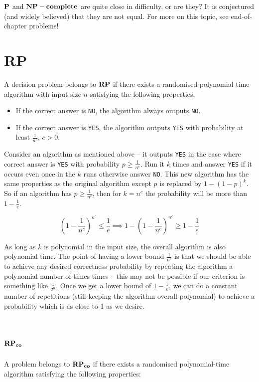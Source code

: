 $\mathbf{P}$ and $\mathbf{NP-complete}$ are quite close in difficulty, or are they? It is conjectured (and widely believed) that they 
are not equal. For more on this topic, see end-of-chapter problems!
\section{RP}

A decision problem belongs to $\mathbf{RP}$ if there exists a randomised polynomial-time algorithm with input size $n$ 
satisfying the following properties:

\begin{itemize}
\item If the correct answer is \texttt{NO}, the algorithm always outputs \texttt{NO}.
\item If the correct answer is \texttt{YES}, the algorithm outputs \texttt{YES} with 
probability at least $\frac{1}{n^c}$, $c>0$.
\end{itemize}

Consider an algorithm as mentioned above -- it outputs \texttt{YES} in the case where correct answer is 
\texttt{YES} with probability $p \ge \frac{1}{n^c}$. Run it $k$ times and answer \texttt{YES} 
if it occurs even once in the $k$ runs otherwise answer \texttt{NO}. This new algorithm has the 
same properties as the original algorithm except $p$ is replaced by $1-(1-p)^k$. So if an 
algorithm has $p \ge \frac{1}{n^c}$, then for $k=n^c$ the probability will be more than $1-\frac{1}{e}$. 

\[
(1-\frac{1}{n^c})^{n^c} \le \frac{1}{e} \implies 1-(1-\frac{1}{n^c})^{n^c} \ge 1-\frac{1}{e}
\]

\vspace{1em}
As long as $k$ is polynomial in the input size, the overall algorithm is also polynomial time.
The point of having a lower bound $\frac{1}{n^c}$ is that we should be able to 
achieve any desired correctness probability by repeating the algorithm a polynomial number of times
times -- this may not be possible if our criterion is something like $\frac{1}{2^n}$. Once we get a 
lower bound of $1-\frac{1}{e}$, we can do a constant number of repetitions (still keeping the 
algorithm overall polynomial) to achieve a probability which is as close to 1 
as we desire. 

\section*{$\mathbf{RP_{co}}$}
A problem belongs to $\mathbf{RP_{co}}$ if there exists a randomised polynomial-time algorithm satisfying the 
following properties:

